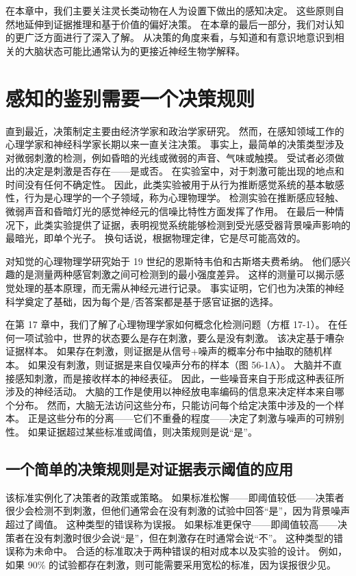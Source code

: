 在本章中，我们主要关注灵长类动物在人为设置下做出的感知决定。 这些原则自然地延伸到证据推理和基于价值的偏好决策。 在本章的最后一部分，我们对认知的更广泛方面进行了深入了解。 从决策的角度来看，与知道和有意识地意识到相关的大脑状态可能比通常认为的更接近神经生物学解释。

\section{感知的鉴别需要一个决策规则}

直到最近，决策制定主要由经济学家和政治学家研究。 然而，在感知领域工作的心理学家和神经科学家长期以来一直关注决策。 事实上，最简单的决策类型涉及对微弱刺激的检测，例如昏暗的光线或微弱的声音、气味或触摸。 受试者必须做出的决定是刺激是否存在——是或否。 在实验室中，对于刺激可能出现的地点和时间没有任何不确定性。 因此，此类实验被用于从行为推断感觉系统的基本敏感性，行为是心理学的一个子领域，称为心理物理学。 检测实验在推断感应轻触、微弱声音和昏暗灯光的感觉神经元的信噪比特性方面发挥了作用。 在最后一种情况下，此类实验提供了证据，表明视觉系统能够检测到受光感受器背景噪声影响的最暗光，即单个光子。 换句话说，根据物理定律，它是尽可能高效的。

对知觉的心理物理学研究始于 19 世纪的恩斯特韦伯和古斯塔夫费希纳。 他们感兴趣的是测量两种感官刺激之间可检测到的最小强度差异。 这样的测量可以揭示感觉处理的基本原理，而无需从神经元进行记录。 事实证明，它们也为决策的神经科学奠定了基础，因为每个是/否答案都是基于感官证据的选择。

在第 17 章中，我们了解了心理物理学家如何概念化检测问题（方框 17-1）。 在任何一项试验中，世界的状态要么是存在刺激，要么是没有刺激。 该决定基于嘈杂证据样本。 如果存在刺激，则证据是从信号+噪声的概率分布中抽取的随机样本。 如果没有刺激，则证据是来自仅噪声分布的样本（图 56-1A）。 大脑并不直接感知刺激，而是接收样本的神经表征。 因此，一些噪音来自于形成这种表征所涉及的神经活动。 大脑的工作是使用以神经放电率编码的信息来决定样本来自哪个分布。 然而，大脑无法访问这些分布，只能访问每个给定决策中涉及的一个样本。 正是这些分布的分离——它们不重叠的程度——决定了刺激与噪声的可辨别性。 如果证据超过某些标准或阈值，则决策规则是说“是”。

\subsection{一个简单的决策规则是对证据表示阈值的应用}
该标准实例化了决策者的政策或策略。 如果标准松懈——即阈值较低——决策者很少会检测不到刺激，但他们通常会在没有刺激的试验中回答“是”，因为背景噪声超过了阈值。 这种类型的错误称为误报。 如果标准更保守——即阈值较高——决策者在没有刺激时很少会说“是”，但在刺激存在时通常会说“不”。 这种类型的错误称为未命中。 合适的标准取决于两种错误的相对成本以及实验的设计。 例如，如果 90\% 的试验都存在刺激，则可能需要采用宽松的标准，因为误报很少见。

